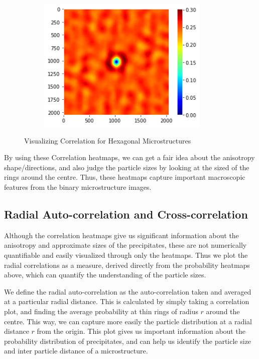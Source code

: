 \documentclass[12pt, a4paper]{report}
\begin{document}
\begin{figure}[H]
\begin{subfigure}{.32\textwidth}
  \includegraphics[width=0.9\textwidth]{Pictures/MSFeatures/CorrHexaCross.png}
  \label{img:microstrImg}
\end{subfigure}
\caption{Visualizing Correlation for Hexagonal Microstructures}
\label{fig:test}
\end{figure}
By using these Correlation heatmaps, we can get a fair idea about the anisotropy shape/directions, and also judge the particle sizes by looking at the sized of the rings around the centre. Thus, these heatmaps capture important macroscopic features from the binary microstructure images. 


\subsection{Radial Auto-correlation and Cross-correlation}

Although the correlation heatmaps give us significant information about the anisotropy and approximate sizes of the precipitates, these are not numerically quantifiable and easily visualized through only the heatmaps. Thus we plot the radial correlations as a measure, derived directly from the probability heatmaps above, which can quantify the understanding of the particle sizes. 

We define the radial auto-correlation as the auto-correlation taken and averaged at a particular radial distance. This is calculated by simply taking a correlation plot, and finding the average probability at thin rings of radius $r$ around the centre. This way, we can capture more easily the particle distribution at a radial distance $r$ from the origin. This plot gives us important information about the probability distribution of precipitates, and can help us identify the particle size and inter particle distance of a microstructure. 
\end{document}
